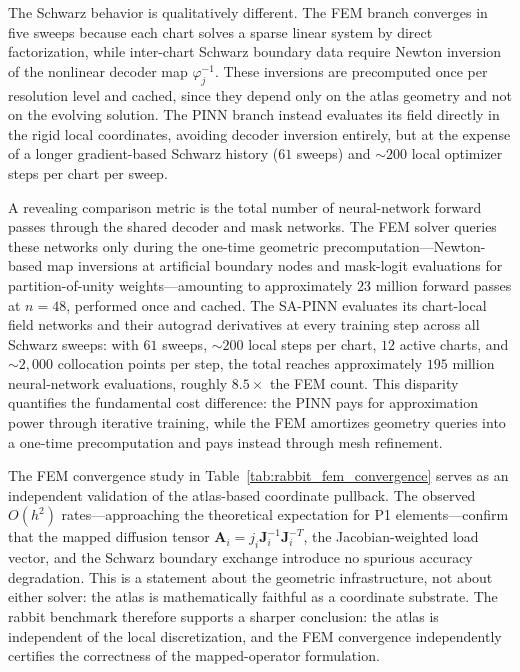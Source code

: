 \documentclass[sort&compress]{svjour3} %
\begin{document}
The Schwarz behavior is qualitatively different. The FEM branch converges in five sweeps because each chart solves a sparse linear system by direct factorization, while inter-chart Schwarz boundary data require Newton inversion of the nonlinear decoder map $\varphi_j^{-1}$. These inversions are precomputed once per resolution level and cached, since they depend only on the atlas geometry and not on the evolving solution. The PINN branch instead evaluates its field directly in the rigid local coordinates, avoiding decoder inversion entirely, but at the expense of a longer gradient-based Schwarz history ($61$ sweeps) and ${\sim}200$ local optimizer steps per chart per sweep.

A revealing comparison metric is the total number of neural-network forward passes through the shared decoder and mask networks. The FEM solver queries these networks only during the one-time geometric precomputation---Newton-based map inversions at artificial boundary nodes and mask-logit evaluations for partition-of-unity weights---amounting to approximately $23$ million forward passes at $n=48$, performed once and cached. The SA-PINN evaluates its chart-local field networks and their autograd derivatives at every training step across all Schwarz sweeps: with $61$ sweeps, ${\sim}200$ local steps per chart, $12$ active charts, and ${\sim}2{,}000$ collocation points per step, the total reaches approximately $195$ million neural-network evaluations, roughly $8.5\times$ the FEM count. This disparity quantifies the fundamental cost difference: the PINN pays for approximation power through iterative training, while the FEM amortizes geometry queries into a one-time precomputation and pays instead through mesh refinement.

The FEM convergence study in Table~\ref{tab:rabbit_fem_convergence} serves as an independent validation of the atlas-based coordinate pullback. The observed $O(h^2)$ rates---approaching the theoretical expectation for P1 elements---confirm that the mapped diffusion tensor $\mathbf{A}_i = j_i \mathbf{J}_i^{-1}\mathbf{J}_i^{-T}$, the Jacobian-weighted load vector, and the Schwarz boundary exchange introduce no spurious accuracy degradation. This is a statement about the geometric infrastructure, not about either solver: the atlas is mathematically faithful as a coordinate substrate. The rabbit benchmark therefore supports a sharper conclusion: the atlas is independent of the local discretization, and the FEM convergence independently certifies the correctness of the mapped-operator formulation.
\end{document}

